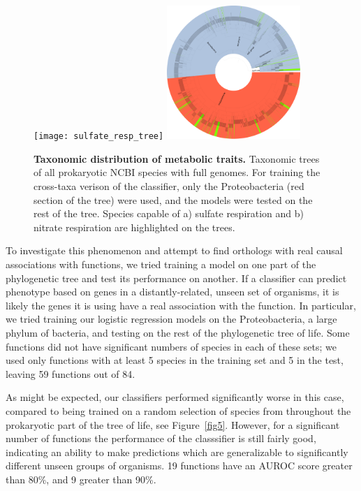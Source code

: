 \documentclass[10pt,letterpaper]{article}
\begin{document}
\begin{figure}
\texttt{[image: sulfate\_resp\_tree]}
\includegraphics[width=0.45\textwidth]{nitrate_resp_tree}
\caption{{\bf Taxonomic distribution of metabolic traits.}
Taxonomic trees of all prokaryotic NCBI species with full genomes. For training the cross-taxa verison of the classifier, only the Proteobacteria (red section of the tree) were used, and the models were tested on the rest of the tree. Species capable of a) sulfate respiration and b) nitrate respiration are highlighted on the trees.}
\label{fig4}
\end{figure}

To investigate this phenomenon and attempt to find orthologs with real causal associations with functions, we tried training a model on one part of the phylogenetic tree and test its performance on another. If a classifier can predict phenotype based on genes in a distantly-related, unseen set of organisms, it is likely the genes it is using have a real association with the function. In particular, we tried training our logistic regression models on the Proteobacteria, a large phylum of bacteria, and testing on the rest of the phylogenetic tree of life. Some functions did not have significant numbers of species in each of these sets; we used only functions with at least 5 species in the training set and 5 in the test, leaving 59 functions out of 84. 

As might be expected, our classifiers performed significantly worse in this case, compared to being trained on a random selection of species from throughout the prokaryotic part of the tree of life, see Figure~\ref{fig5}. However, for a significant number of functions the performance of the classsifier is still fairly good, indicating an ability to make predictions which are generalizable to significantly different unseen groups of organisms. 19 functions have an AUROC score greater than 80\%, and 9 greater than 90\%. 
\end{document}
